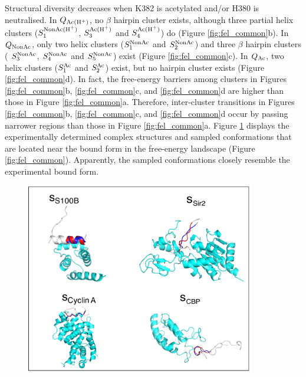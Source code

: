 Structural diversity decreases when K382 is acetylated and/or H380 is neutralised. 
In $Q_{\rm Ac(H^+)}$, no $\beta$ hairpin cluster exists, although three partial helix clusters ($S_1^{\rm NonAc(H^+)}$, $S_3^{\rm Ac(H^+)}$ and $S_4^{\rm Ac(H^+)}$) do (Figure \ref{fig:fel_common}b).
In $Q_{\rm NonAc}$, only two helix clusters ($S_1^{\rm NonAc}$ and $S_2^{\rm NonAc}$) and three $\beta$ hairpin clusters ( $S_3^{\rm NonAc}$,  $S_4^{\rm NonAc}$ and  $S_5^{\rm NonAc}$) exist (Figure \ref{fig:fel_common}c).
In $Q_{\rm Ac}$, two helix clusters ($S_1^{\rm Ac}$ and $S_2^{\rm Ac}$) exist, but no hairpin cluster exists (Figure \ref{fig:fel_common}d).
In fact, the free-energy barriers among clusters in Figures \ref{fig:fel_common}b, \ref{fig:fel_common}c, and \ref{fig:fel_common}d are higher than those in Figure \ref{fig:fel_common}a. 
Therefore, inter-cluster transitions in Figures \ref{fig:fel_common}b, \ref{fig:fel_common}c, and \ref{fig:fel_common}d occur by passing narrower regions than those in Figure \ref{fig:fel_common}a. 
Figure \ref{fig:comp_structs} displays the experimentally determined complex structures and sampled conformations that are located near the bound form in the free-energy landscape (Figure \ref{fig:fel_common}). 
Apparently, the sampled conformations closely resemble the experimental bound form.
\begin{figure}
  \centering
  \includegraphics[width=10cm]{../single_CTD/figures_p53ctd/11.pdf}
  \caption{\label{fig:comp_structs}}
\end{figure}

